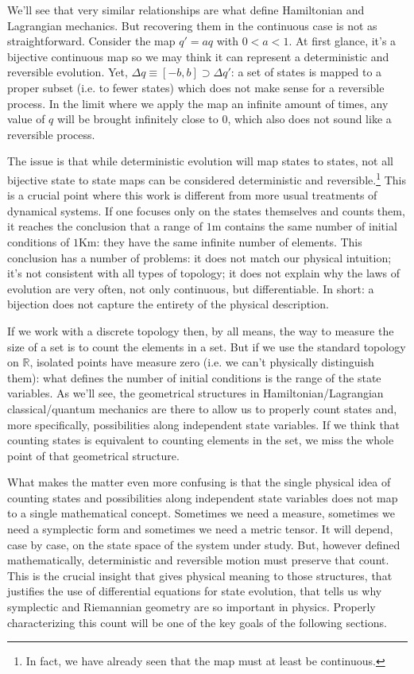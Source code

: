 \documentclass[smallextended]{svjour3}
\numberwithin{equation}{section}
\theoremstyle{definition}
\begin{document}
We'll see that very similar relationships are what define Hamiltonian and Lagrangian mechanics. But recovering them in the continuous case is not as straightforward. Consider the map $q'=aq$ with $0<a<1$. At first glance, it's a bijective continuous map so we may think it can represent a deterministic and reversible evolution. Yet, $\Delta q \equiv [-b, b] \supset \Delta q'$: a set of states is mapped to a proper subset (i.e. to fewer states) which does not make sense for a reversible process. In the limit where we apply the map an infinite amount of times, any value of $q$ will be brought infinitely close to $0$, which also does not sound like a reversible process.

The issue is that while deterministic evolution will map states to states, not all bijective state to state maps can be considered deterministic and reversible.\footnote{In fact, we have already seen that the map must at least be continuous.} This is a crucial point where this work is different from more usual treatments of dynamical systems. If one focuses only on the states themselves and counts them, it reaches the conclusion that a range of $1$m contains the same number of initial conditions of $1$Km: they have the same infinite number of elements. This conclusion has a number of problems: it does not match our physical intuition; it's not consistent with all types of topology; it does not explain why the laws of evolution are very often, not only continuous, but differentiable. In short: a bijection does not capture the entirety of the physical description.

If we work with a discrete topology then, by all means, the way to measure the size of a set is to count the elements in a set. But if we use the standard topology on $\mathbb{R}$, isolated points have measure zero (i.e. we can't physically distinguish them): what defines the number of initial conditions is the range of the state variables. As we'll see, the geometrical structures in Hamiltonian/Lagrangian classical/quantum mechanics are there to allow us to properly count states and, more specifically, possibilities along independent state variables. If we think that counting states is equivalent to counting elements in the set, we miss the whole point of that geometrical structure.

What makes the matter even more confusing is that the single physical idea of counting states and possibilities along independent state variables does not map to a single mathematical concept. Sometimes we need a measure, sometimes we need a symplectic form and sometimes we need a metric tensor. It will depend, case by case, on the state space of the system under study. But, however defined mathematically, deterministic and reversible motion must preserve that count. This is the crucial insight that gives physical meaning to those structures, that justifies the use of differential equations for state evolution, that tells us why symplectic and Riemannian geometry are so important in physics. Properly characterizing this count will be one of the key goals of the following sections.
\end{document}
